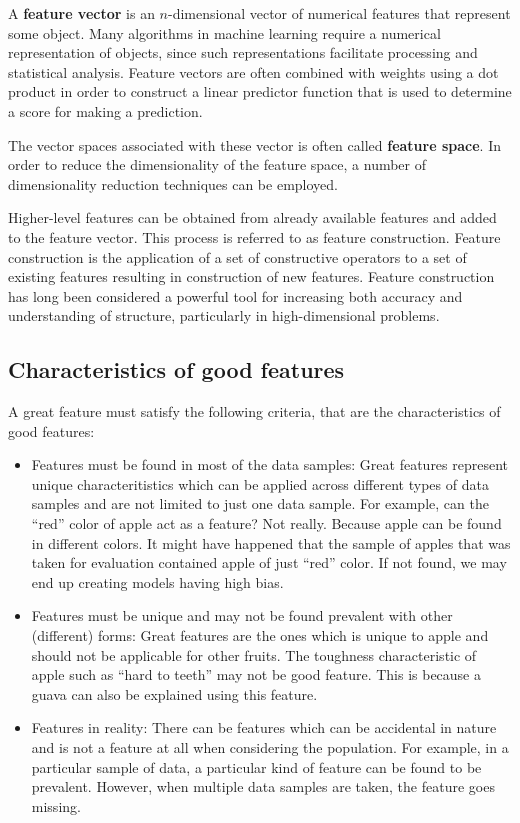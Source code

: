A \textbf{feature vector} is an \(n\)-dimensional vector of numerical features that represent some object. Many algorithms in machine learning require a numerical representation of objects, since such representations facilitate processing and statistical analysis. Feature vectors are often combined with weights using a dot product in order to construct a linear predictor function that is used to determine a score for making a prediction.

The vector spaces associated with these vector is often called \textbf{feature space}. In order to reduce the dimensionality of the feature space, a number of dimensionality reduction techniques can be employed.

Higher-level features can be obtained from already available features and added to the feature vector. This process is referred to as feature construction. Feature construction is the application of a set of constructive operators to a set of existing features resulting in construction of new features. Feature construction has long been considered a powerful tool for increasing both accuracy and understanding of structure, particularly in high-dimensional problems.

\subsection{Characteristics of good features}
A great feature must satisfy the following criteria, that are the characteristics of good features:
\begin{itemize}[topsep={0pt}, partopsep={0pt}]
    \item Features must be found in most of the data samples: Great features represent unique characteritistics which can be applied across different types of data samples and are not limited to just one data sample. For example, can the “red” color of apple act as a feature? Not really. Because apple can be found in different colors. It might have happened that the sample of apples that was taken for evaluation contained apple of just “red” color. If not found, we may end up creating models having high bias. 
    \item Features must be unique and may not be found prevalent with other (different) forms: Great features are the ones which is unique to apple and should not be applicable for other fruits. The toughness characteristic of apple such as “hard to teeth” may not be good feature. This is because a guava can also be explained using this feature. 
    \item Features in reality: There can be features which can be accidental in nature and is not a feature at all when considering the population. For example, in a particular sample of data, a particular kind of feature can be found to be prevalent. However, when multiple data samples are taken, the feature goes missing. 
\end{itemize}

